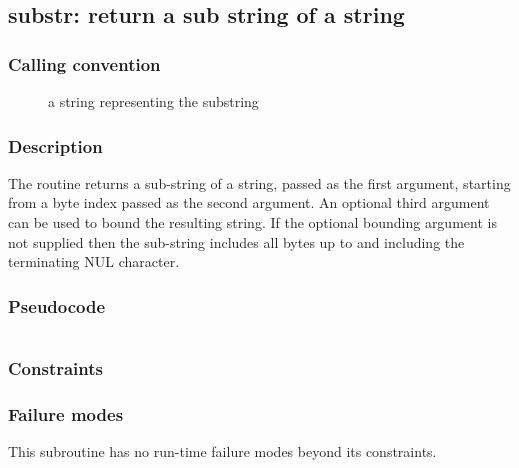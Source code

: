 \clearpage
{}
{}
\label{subr:substr}
\subsection*{substr: return a sub string of a string}

\subsubsection*{Calling convention}

\begin{description}
\item[] a string representing the substring
\end{description}

\subsubsection*{Description}

The  routine returns a sub-string of a string,
passed as the first argument, starting from a byte index passed as the
second argument.  An optional third argument can be used to bound the
resulting string.  If the optional bounding argument is not supplied
then the sub-string includes all bytes up to and including the
terminating NUL character.

\subsubsection*{Pseudocode}

\begin{verbatim}
\end{verbatim}

\subsubsection*{Constraints}

\subsubsection*{Failure modes}

This subroutine has no run-time failure modes beyond its constraints.
